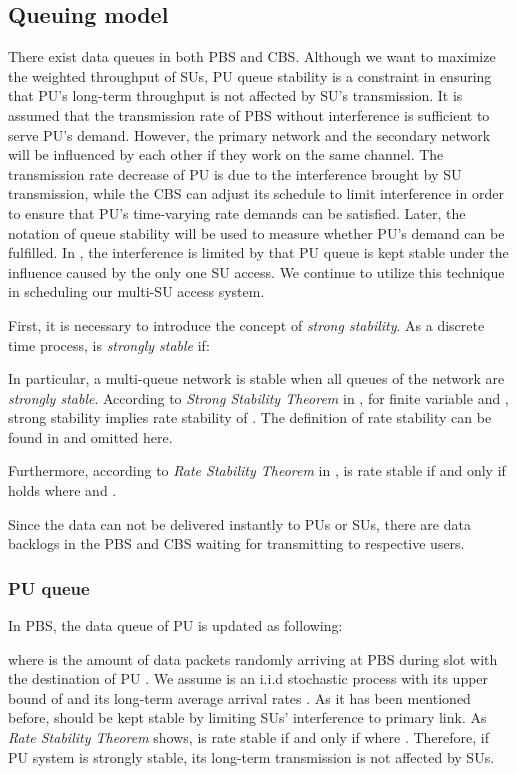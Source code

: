 \documentclass[journal]{IEEEtran}
\begin{document}
\subsection{Queuing model}
There exist data queues in both PBS and CBS. Although we want to maximize the weighted throughput of SUs, PU queue
stability is a constraint in ensuring that PU's  long-term throughput is not affected by SU's transmission. It is assumed that the transmission rate of PBS
without interference is sufficient to serve PU's demand. However,  the primary network and  the secondary network will be influenced by each other if they work on the same channel. The transmission rate decrease of PU is due to the interference
brought by SU transmission, while the CBS can adjust its schedule to limit interference in order to ensure that PU's time-varying rate demands can be satisfied. Later, the notation of queue stability will be used to measure whether PU's demand can be fulfilled. In
\cite{lapiccirella2013distributed}, the interference is limited by that PU queue is kept stable under the influence caused
by the only one SU access. We continue to utilize this technique in scheduling our multi-SU access system.


First, it is necessary to introduce the concept of \emph{strong stability}. As a discrete time process,
 is \emph{strongly stable} if:
  
In particular, a  multi-queue  network is  stable when all queues of the network are \emph{strongly stable}.
According to \emph{Strong Stability Theorem} in \cite{neely2010stochastic}, for finite variable  and , strong
stability implies rate stability of . The definition of rate stability can be found in \cite{neely2010stochastic}
and omitted here.

Furthermore, according to \emph{Rate Stability Theorem} in \cite{neely2010stochastic},  is rate stable if and only if  holds where  and
.

Since the data can not be delivered instantly to PUs or SUs, there are data backlogs in the PBS and CBS waiting for transmitting to respective users.

\subsubsection{PU queue}
In PBS, the data queue of PU  is updated as following:
  
 where  is the amount of  data packets randomly arriving at PBS during slot  with the destination of PU . We assume  is
 an i.i.d stochastic process with its upper bound of  and its  long-term average arrival rates 
 . As it has been mentioned before,  should be kept stable by limiting SUs' interference to
 primary link.  As  \emph{Rate Stability Theorem} shows,   is rate stable if and only if  where
 . Therefore, if PU system is strongly stable, its long-term transmission is not affected by SUs.
\end{document}

